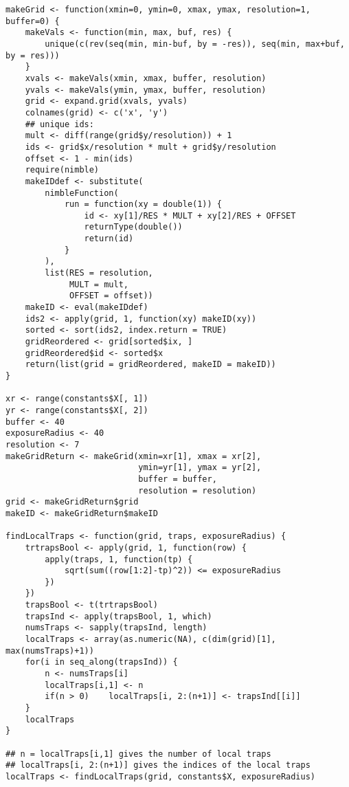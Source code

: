 \begin{singlespace}
\begin{small}
\begin{verbatim}
makeGrid <- function(xmin=0, ymin=0, xmax, ymax, resolution=1, buffer=0) {
    makeVals <- function(min, max, buf, res) {
        unique(c(rev(seq(min, min-buf, by = -res)), seq(min, max+buf, by = res)))
    }
    xvals <- makeVals(xmin, xmax, buffer, resolution)
    yvals <- makeVals(ymin, ymax, buffer, resolution)
    grid <- expand.grid(xvals, yvals)
    colnames(grid) <- c('x', 'y')
    ## unique ids:
    mult <- diff(range(grid$y/resolution)) + 1
    ids <- grid$x/resolution * mult + grid$y/resolution
    offset <- 1 - min(ids)
    require(nimble)
    makeIDdef <- substitute(
        nimbleFunction(
            run = function(xy = double(1)) {
                id <- xy[1]/RES * MULT + xy[2]/RES + OFFSET
                returnType(double())
                return(id)
            }
        ),
        list(RES = resolution,
             MULT = mult,
             OFFSET = offset))
    makeID <- eval(makeIDdef)
    ids2 <- apply(grid, 1, function(xy) makeID(xy))
    sorted <- sort(ids2, index.return = TRUE)
    gridReordered <- grid[sorted$ix, ]
    gridReordered$id <- sorted$x
    return(list(grid = gridReordered, makeID = makeID))
}

xr <- range(constants$X[, 1])
yr <- range(constants$X[, 2])
buffer <- 40
exposureRadius <- 40
resolution <- 7
makeGridReturn <- makeGrid(xmin=xr[1], xmax = xr[2],
                           ymin=yr[1], ymax = yr[2],
                           buffer = buffer,
                           resolution = resolution)
grid <- makeGridReturn$grid
makeID <- makeGridReturn$makeID

findLocalTraps <- function(grid, traps, exposureRadius) {
    trtrapsBool <- apply(grid, 1, function(row) {
        apply(traps, 1, function(tp) {
            sqrt(sum((row[1:2]-tp)^2)) <= exposureRadius
        })
    })
    trapsBool <- t(trtrapsBool)
    trapsInd <- apply(trapsBool, 1, which)
    numsTraps <- sapply(trapsInd, length)
    localTraps <- array(as.numeric(NA), c(dim(grid)[1], max(numsTraps)+1))
    for(i in seq_along(trapsInd)) {
        n <- numsTraps[i]
        localTraps[i,1] <- n
        if(n > 0)    localTraps[i, 2:(n+1)] <- trapsInd[[i]]
    }
    localTraps
}

## n = localTraps[i,1] gives the number of local traps
## localTraps[i, 2:(n+1)] gives the indices of the local traps
localTraps <- findLocalTraps(grid, constants$X, exposureRadius)


\end{verbatim}
\end{small}
\end{singlespace}
